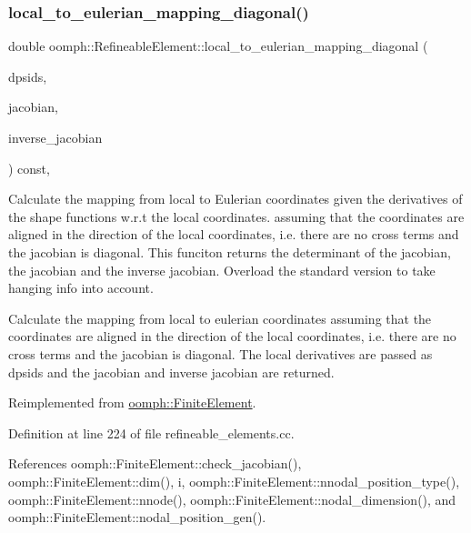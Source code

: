 \subsubsection{\texorpdfstring{local\+\_\+to\+\_\+eulerian\+\_\+mapping\+\_\+diagonal()}{local\_to\_eulerian\_mapping\_diagonal()}}
{\footnotesize\ttfamily double oomph\+::\+Refineable\+Element\+::local\+\_\+to\+\_\+eulerian\+\_\+mapping\+\_\+diagonal (\begin{DoxyParamCaption}\item[{const \hyperlink{classoomph_1_1DShape}{D\+Shape} \&}]{dpsids,  }\item[{\hyperlink{classoomph_1_1DenseMatrix}{Dense\+Matrix}$<$ double $>$ \&}]{jacobian,  }\item[{\hyperlink{classoomph_1_1DenseMatrix}{Dense\+Matrix}$<$ double $>$ \&}]{inverse\+\_\+jacobian }\end{DoxyParamCaption}) const\hspace{0.3cm}{\ttfamily [protected]}, {\ttfamily [virtual]}}



Calculate the mapping from local to Eulerian coordinates given the derivatives of the shape functions w.\+r.\+t the local coordinates. assuming that the coordinates are aligned in the direction of the local coordinates, i.\+e. there are no cross terms and the jacobian is diagonal. This funciton returns the determinant of the jacobian, the jacobian and the inverse jacobian. Overload the standard version to take hanging info into account. 

Calculate the mapping from local to eulerian coordinates assuming that the coordinates are aligned in the direction of the local coordinates, i.\+e. there are no cross terms and the jacobian is diagonal. The local derivatives are passed as dpsids and the jacobian and inverse jacobian are returned. 

Reimplemented from \hyperlink{classoomph_1_1FiniteElement_a470aa4b64c3789ec17702cce6f883320}{oomph\+::\+Finite\+Element}.



Definition at line 224 of file refineable\+\_\+elements.\+cc.



References oomph\+::\+Finite\+Element\+::check\+\_\+jacobian(), oomph\+::\+Finite\+Element\+::dim(), i, oomph\+::\+Finite\+Element\+::nnodal\+\_\+position\+\_\+type(), oomph\+::\+Finite\+Element\+::nnode(), oomph\+::\+Finite\+Element\+::nodal\+\_\+dimension(), and oomph\+::\+Finite\+Element\+::nodal\+\_\+position\+\_\+gen().



